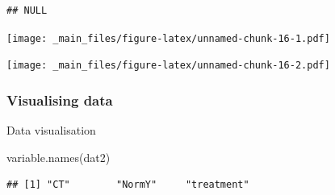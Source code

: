 \documentclass[
]{book}
\newenvironment{Shaded}{\begin{snugshade}}{\end{snugshade}}
\newcommand{\CommentTok}[1]{\textcolor[rgb]{0.56,0.35,0.01}{\textit{#1}}}
\newcommand{\FunctionTok}[1]{\textcolor[rgb]{0.00,0.00,0.00}{#1}}
\newcommand{\NormalTok}[1]{#1}
\newcommand{\SpecialCharTok}[1]{\textcolor[rgb]{0.00,0.00,0.00}{#1}}
\begin{document}
\begin{verbatim}
## NULL
\end{verbatim}

\begin{Shaded}
\end{Shaded}

\texttt{[image: \_main\_files/figure-latex/unnamed-chunk-16-1.pdf]}

\begin{Shaded}
\end{Shaded}

\texttt{[image: \_main\_files/figure-latex/unnamed-chunk-16-2.pdf]}

\begin{Shaded}
\end{Shaded}

\hypertarget{visualising-data}{%
\subsubsection{Visualising data}\label{visualising-data}}

Data visualisation

\begin{Shaded}
\begin{Highlighting}[]
\FunctionTok{variable.names}\NormalTok{(dat2)}
\end{Highlighting}
\end{Shaded}

\begin{verbatim}
## [1] "CT"        "NormY"     "treatment"
\end{verbatim}
\end{document}
